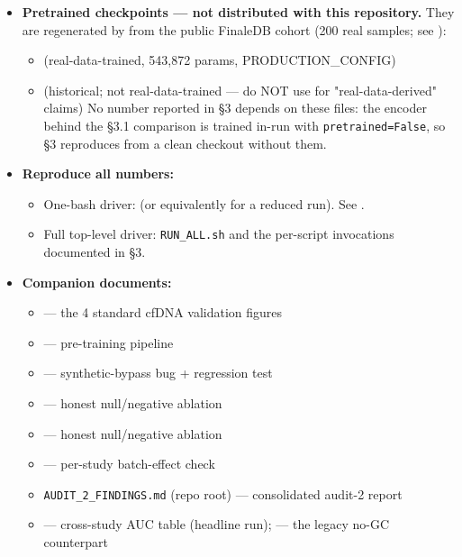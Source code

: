 \documentclass[11pt]{article}
\begin{document}
\begin{itemize}
\begin{itemize}
\end{itemize}
\item
\textbf{Pretrained checkpoints --- not distributed with this repository.} They are regenerated by  from the public FinaleDB cohort (200 real samples; see ):
\begin{itemize}
\item
{} (real-data-trained, 543,872 params, PRODUCTION\_CONFIG)
\item
{} (historical; not real-data-trained --- do NOT use for "real-data-derived" claims) No number reported in \S{}3 depends on these files: the encoder behind the \S{}3.1 comparison is trained in-run with \texttt{pretrained=False}, so \S{}3 reproduces from a clean checkout without them.
\end{itemize}
\item
\textbf{Reproduce all numbers:}
\begin{itemize}
\item
One-bash driver:  (or equivalently  for a reduced run). See .
\item
Full top-level driver: \texttt{RUN\_\allowbreak{}ALL.sh} and the per-script invocations documented in \S{}3.
\end{itemize}
\item
\textbf{Companion documents:}
\begin{itemize}
\item
{} --- the 4 standard cfDNA validation figures
\item
{} --- pre-training pipeline
\item
{} --- synthetic-bypass bug + regression test
\item
{} --- honest null/negative ablation
\item
{} --- honest null/negative ablation
\item
{} --- per-study batch-effect check
\item
\texttt{AUDIT\_\allowbreak{}2\_\allowbreak{}FINDINGS.md} (repo root) --- consolidated audit-2 report
\item
{} --- cross-study AUC table (headline run);  --- the legacy no-GC counterpart

\end{itemize}
\end{itemize}
\end{document}

